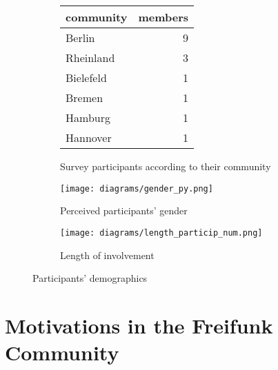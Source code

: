 \documentclass{scrartcl}
\begin{document}
\begin{figure}[h]
  \begin{subfigure}[h]{\textwidth}
    \centering
    \begin{tabular}{ l | r }
      \hline
      \textbf{community} & \textbf{members}\\
      \hline
      Berlin & 9 \\
      Rheinland & 3 \\
      Bielefeld & 1 \\
      Bremen & 1 \\
      Hamburg & 1 \\
      Hannover & 1 \\
      \hline
    \end{tabular}
  \caption{Survey participants according to their community}
  \label{tab:communities}
  \end{subfigure}
  \qquad
  \begin{subfigure}[h]{0.45\textwidth}
    \texttt{[image: diagrams/gender\_py.png]}
    \caption{Perceived participants' gender}
    \label{fig:gender}
  \end{subfigure}
  \qquad
  \begin{subfigure}[h]{0.45\textwidth}
    \centering
    \texttt{[image: diagrams/length\_particip\_num.png]}
    \caption{Length of involvement}
    \label{fig:length}
  \end{subfigure}
  \caption{Participants' demographics}
  \label{fig:demography}
\end{figure}


\section{Motivations in the Freifunk Community}

\begin{comment}
\begin{itemize}
  \item is the focus of the paper;
  \item only pull up the foss motivations as comparison to underline similarities and differences with the findings here
  \item general part of the questionnaire $\rightarrow$ cluster answers
  \item some graphs/tables on the specific questions
\end{itemize}
\end{comment}
\end{document}
